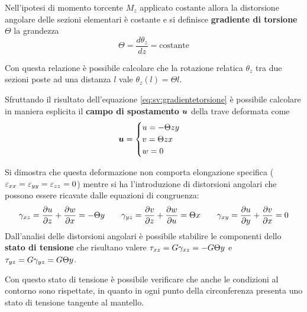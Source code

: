     	\begin{concetto}
    	    Nell'ipotesi di momento torcente $M_z$ applicato costante allora la distorsione angolare delle sezioni elementari è costante e si definisce \textbf{gradiente di torsione} $\Theta$ la grandezza
    	    \begin{equation} \label{eq:sv:gradientetorsione}
    	        \Theta =\frac{d\theta_z}{dz} =\textrm{costante}
    	    \end{equation}
    	\end{concetto}
    	Con questa relazione è possibile calcolare che la rotazione relatica $\theta_z$ tra due sezioni poste ad una distanza $l$ vale $\theta_z(l)=\Theta l$.
    	\begin{concetto}
    	    Sfruttando il risultato dell'equazione \ref{eq:sv:gradientetorsione} è possibile calcolare in maniera esplicita il \textbf{campo di spostamento} $\boldsymbol{u}$ della trave deformata come
    	    \begin{equation}
    	        \boldsymbol{u} = \begin{cases}
    	            u =- \Theta z y \\ v =\Theta z x \\ w =0
    	        \end{cases}
    	    \end{equation}
    	\end{concetto}
    	Si dimostra che questa deformazione non comporta elongazione specifica ($\varepsilon_{xx} = \varepsilon_{yy} = \varepsilon_{zz} = 0$) mentre si ha l'introduzione di distorsioni angolari che possono essere ricavate dalle equazioni di congruenza:
    	\[ \gamma_{xz} = \frac{\partial u}{\partial z} + \frac{\partial w}{\partial x} = -\Theta y \qquad \gamma_{yz} = \frac{\partial v}{\partial z} + \frac{\partial w}{\partial u} =\Theta x \qquad \gamma_{xy} = \frac{\partial u}{\partial y} + \frac{\partial v}{\partial x} = 0 \]
    	Dall'analisi delle distorsioni angolari è possibile stabilire le componenti dello \textbf{stato di tensione} che risultano valere $\tau_{xz} = G \gamma_{xz} = - G \Theta y$ e $\tau_{yz} =G \gamma_{yz} =G \Theta y$.
    	
    	Con questo stato di tensione è possibile verificare che anche le condizioni al contorno sono rispettate, in quanto in ogni punto della circonferenza presenta uno stato di tensione tangente al mantello.
    	
